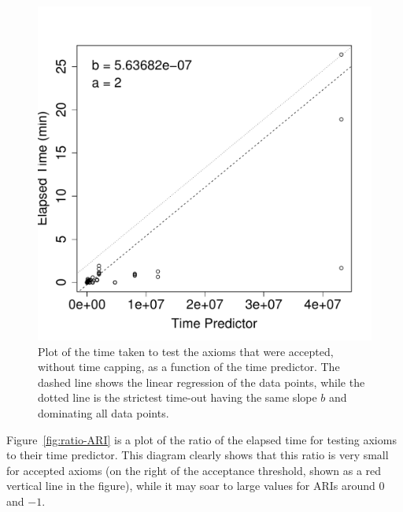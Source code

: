 \documentclass{sig-alternate}
\begin{document}
\begin{figure}[t]
\begin{center}
    \includegraphics[height=\plotheight]{time-tp-acc}
\end{center}
\caption{Plot of the time taken to test the axioms that were accepted, without time capping,
  as a function of the time predictor. The dashed line shows the linear regression of the
  data points, while the dotted line is the strictest time-out having the same slope $b$
  and dominating all data points.}
\label{fig:time-tp-acc}
\end{figure}

Figure~\ref{fig:ratio-ARI} is a plot of the ratio of the elapsed time for testing axioms
to their time predictor. This diagram clearly shows that this ratio is very small for
accepted axioms (on the right of the acceptance threshold, shown as a red vertical line in the figure),
while it may soar to large values for ARIs around 0 and $-1$.
\end{document}
